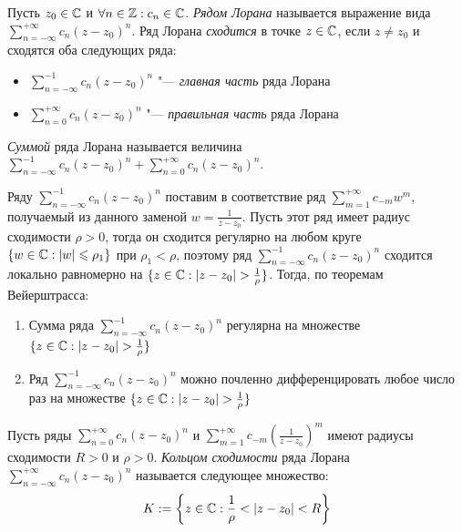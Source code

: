 \begin{definition}
	Пусть $z_0 \in \mathbb{C}$ и $\forall n \in \mathbb{Z}: c_n \in \mathbb{C}$. \textit{Рядом Лорана} называется выражение вида $\sum\limits_{n = -\infty}^{+\infty}c_n(z - z_0)^n$. Ряд Лорана \textit{сходится} в точке $z \in \mathbb{C}$, если $z \ne z_0$ и сходятся оба следующих ряда:
	\begin{itemize}
		\item $\sum\limits_{n = -\infty}^{-1}c_n(z - z_0)^n$ "--- \textit{главная часть} ряда Лорана
		\item $\sum\limits_{n = 0}^{+\infty}c_n(z - z_0)^n$ "--- \textit{правильная часть} ряда Лорана
	\end{itemize}
	
	\textit{Суммой} ряда Лорана называется величина $\sum\limits_{n = -\infty}^{-1}c_n(z - z_0)^n + \sum\limits_{n = 0}^{+\infty}c_n(z - z_0)^n$.
\end{definition}


\begin{note}
	Ряду $\sum\limits_{n = -\infty}^{-1}c_n(z - z_0)^n$ поставим в соответствие ряд $\sum\limits_{m = 1}^{+\infty}c_{-m}w^m$, получаемый из данного заменой $w = \frac1{z - z_0}$. Пусть этот ряд имеет радиус сходимости $\rho > 0$, тогда он сходится регулярно на любом круге $\{w \in \mathbb{C}: |w| \leqslant \rho_1\}$ при $\rho_1 < \rho$, поэтому ряд $\sum\limits_{n = -\infty}^{-1}c_n(z - z_0)^n$ сходится локально равномерно на $\{z \in \mathbb{C}: |z - z_0| > \frac1\rho\}$. Тогда, по теоремам Вейерштрасса:
	\begin{enumerate}
		\item Сумма ряда $\sum\limits_{n = -\infty}^{-1}c_n(z - z_0)^n$ регулярна на множестве $\{z \in \mathbb{C}: |z - z_0| > \frac1\rho\}$
		\item Ряд $\sum\limits_{n = -\infty}^{-1}c_n(z - z_0)^n$ можно почленно дифференцировать любое число раз на множестве $\{z \in \mathbb{C}: |z - z_0| > \frac1\rho\}$
	\end{enumerate}
\end{note}


\begin{definition}
	Пусть ряды $\sum\limits_{n = 0}^{+\infty}c_n(z - z_0)^n$ и $\sum\limits_{m = 1}^{+\infty}c_{-m}\left(\frac{1}{z - z_0}\right)^m$ имеют радиусы сходимости $R > 0$ и $\rho > 0$. \textit{Кольцом сходимости} ряда Лорана $\sum\limits_{n = -\infty}^{+\infty}c_n(z - z_0)^n$ называется следующее множество:
	\[K := \left\{z \in \mathbb{C}: \frac1\rho < |z - z_0| < R\right\}\]
\end{definition}

